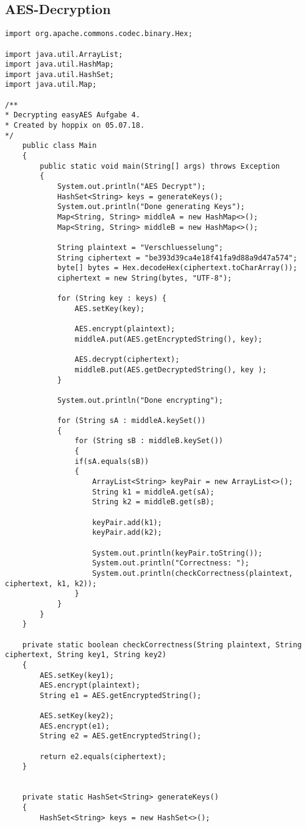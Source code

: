 \documentclass[12pt]{article}
\theoremstyle{plain}
\begin{document}
\subsection{AES-Decryption}
\begin{lstlisting}
import org.apache.commons.codec.binary.Hex;

import java.util.ArrayList;
import java.util.HashMap;
import java.util.HashSet;
import java.util.Map;

/**
* Decrypting easyAES Aufgabe 4.
* Created by hoppix on 05.07.18.
*/
	public class Main
	{
		public static void main(String[] args) throws Exception
		{
			System.out.println("AES Decrypt");
			HashSet<String> keys = generateKeys();
			System.out.println("Done generating Keys");
			Map<String, String> middleA = new HashMap<>();
			Map<String, String> middleB = new HashMap<>();

			String plaintext = "Verschluesselung";
			String ciphertext = "be393d39ca4e18f41fa9d88a9d47a574";
			byte[] bytes = Hex.decodeHex(ciphertext.toCharArray());
			ciphertext = new String(bytes, "UTF-8");

			for (String key : keys) {
				AES.setKey(key);

				AES.encrypt(plaintext);
				middleA.put(AES.getEncryptedString(), key);

				AES.decrypt(ciphertext);
				middleB.put(AES.getDecryptedString(), key );
			}

			System.out.println("Done encrypting");

			for (String sA : middleA.keySet())
			{
				for (String sB : middleB.keySet())
				{
				if(sA.equals(sB))
				{
					ArrayList<String> keyPair = new ArrayList<>();
					String k1 = middleA.get(sA);
					String k2 = middleB.get(sB);

					keyPair.add(k1);
					keyPair.add(k2);

					System.out.println(keyPair.toString());
					System.out.println("Correctness: ");
					System.out.println(checkCorrectness(plaintext, ciphertext, k1, k2));
				}
			}
		}
	}

	private static boolean checkCorrectness(String plaintext, String ciphertext, String key1, String key2)
	{
		AES.setKey(key1);
		AES.encrypt(plaintext);
		String e1 = AES.getEncryptedString();

		AES.setKey(key2);
		AES.encrypt(e1);
		String e2 = AES.getEncryptedString();

		return e2.equals(ciphertext);
	}


	private static HashSet<String> generateKeys()
	{
		HashSet<String> keys = new HashSet<>();


\end{lstlisting}
\end{document}
